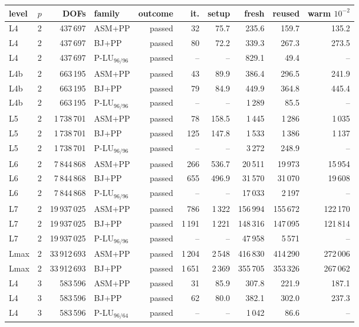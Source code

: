 \begin{tabular}{lrrlrrrrrr}
\toprule
level & $p$ & DOFs & family & outcome & it. & setup & fresh & reused & warm $10^{-2}$\\
\midrule
L4 & 2 & 437\,697 & ASM+PP & passed & 32 & 75.7 & 235.6 & 159.7 & 135.2\\
L4 & 2 & 437\,697 & BJ+PP & passed & 80 & 72.2 & 339.3 & 267.3 & 273.5\\
L4 & 2 & 437\,697 & P-LU$_{96/96}$ & passed & -- & -- & 829.1 & 49.4 & --\\
L4b & 2 & 663\,195 & ASM+PP & passed & 43 & 89.9 & 386.4 & 296.5 & 241.9\\
L4b & 2 & 663\,195 & BJ+PP & passed & 79 & 84.9 & 449.9 & 364.8 & 445.4\\
L4b & 2 & 663\,195 & P-LU$_{96/96}$ & passed & -- & -- & 1\,289 & 85.5 & --\\
L5 & 2 & 1\,738\,701 & ASM+PP & passed & 78 & 158.5 & 1\,445 & 1\,286 & 1\,035\\
L5 & 2 & 1\,738\,701 & BJ+PP & passed & 125 & 147.8 & 1\,533 & 1\,386 & 1\,137\\
L5 & 2 & 1\,738\,701 & P-LU$_{96/96}$ & passed & -- & -- & 3\,272 & 248.9 & --\\
L6 & 2 & 7\,844\,868 & ASM+PP & passed & 266 & 536.7 & 20\,511 & 19\,973 & 15\,954\\
L6 & 2 & 7\,844\,868 & BJ+PP & passed & 655 & 496.9 & 31\,570 & 31\,070 & 19\,608\\
L6 & 2 & 7\,844\,868 & P-LU$_{96/96}$ & passed & -- & -- & 17\,033 & 2\,197 & --\\
L7 & 2 & 19\,937\,025 & ASM+PP & passed & 786 & 1\,322 & 156\,994 & 155\,672 & 122\,170\\
L7 & 2 & 19\,937\,025 & BJ+PP & passed & 1\,191 & 1\,221 & 148\,316 & 147\,095 & 121\,814\\
L7 & 2 & 19\,937\,025 & P-LU$_{96/96}$ & passed & -- & -- & 47\,958 & 5\,571 & --\\
Lmax & 2 & 33\,912\,693 & ASM+PP & passed & 1\,204 & 2\,548 & 416\,830 & 414\,290 & 272\,006\\
Lmax & 2 & 33\,912\,693 & BJ+PP & passed & 1\,651 & 2\,369 & 355\,705 & 353\,326 & 267\,062\\
L4 & 3 & 583\,596 & ASM+PP & passed & 31 & 85.9 & 307.8 & 221.9 & 187.1\\
L4 & 3 & 583\,596 & BJ+PP & passed & 62 & 80.0 & 382.1 & 302.0 & 237.3\\
L4 & 3 & 583\,596 & P-LU$_{96/64}$ & passed & -- & -- & 1\,042 & 86.6 & --\\

\end{tabular}
